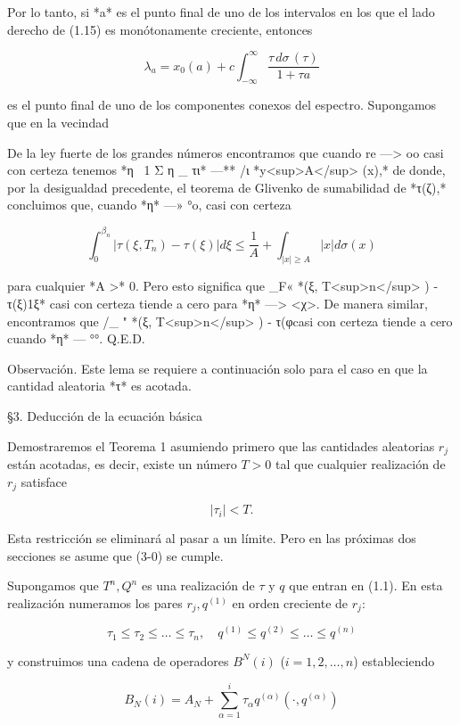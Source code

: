 \documentclass[11pt,a4paper]{article}
\begin{document}
Por lo tanto, si *a* es el punto final de uno de los intervalos en los que el lado derecho de (1.15) es monótonamente creciente, entonces

$$\lambda_a = x_0(a) + c \int_{-\infty}^{\infty} \frac{\tau \, d\sigma \, (\tau)}{1 + \tau a} \tag{1.16}$$

es el punto final de uno de los componentes conexos del espectro. Supongamos que en la vecindad

De la ley fuerte de los grandes números encontramos que cuando re —> oo casi con certeza tenemos *η~ 1 Σ η \_ τι* —*\** /ι *y<sup>A</sup> \x\da(x),* de donde, por la desigualdad precedente, el teorema de Glivenko de sumabilidad de *τ(ζ),* concluimos que, cuando *η* —» °o, casi con certeza

$$\int_{0}^{\beta_{n}} |\tau(\xi, T_{n}) - \tau(\xi)| d\xi \leqslant \frac{1}{A} + \int_{|x| \geqslant A} |x| d\sigma(x)$$

para cualquier *A >* 0. Pero esto significa que \_F« *\τ(ξ, T<sup>n</sup> ) - τ(ξ)\<1ξ* casi con certeza tiende a cero para *η* —> <χ>. De manera similar, encontramos que /\_ " *\τ(ξ, T<sup>n</sup> ) - τ(φ casi con certeza tiende a cero cuando *η* —\* °°. Q.E.D.

Observación. Este lema se requiere a continuación solo para el caso en que la cantidad aleatoria *τ* es acotada.

\S 3. Deducción de la ecuación básica

Demostraremos el Teorema 1 asumiendo primero que las cantidades aleatorias $r_j$ están acotadas, es decir, existe un número $T > 0$ tal que cualquier realización de $r_j$ satisface

$$|\tau_i| < T. \tag{3.0}$$

Esta restricción se eliminará al pasar a un límite. Pero en las próximas dos secciones se asume que (3-0) se cumple.

Supongamos que $T^n, Q^n$ es una realización de $\tau$ y $q$ que entran en (1.1). En esta realización numeramos los pares $r_j, q^{(1)}$ en orden creciente de $r_j$:

$$\tau_1 \leqslant \tau_2 \leqslant \ldots \leqslant \tau_n, \quad q^{(1)} \leqslant q^{(2)} \leqslant \ldots \leqslant q^{(n)}$$

y construimos una cadena de operadores $B^N(i)$ ($i = 1, 2, \ldots, n$) estableciendo

$$B_N(i) = A_N + \sum_{\alpha=1}^{i} \tau_{\alpha} q^{(\alpha)}(\cdot, q^{(\alpha)}) \tag{3.1}$$
\end{document}
